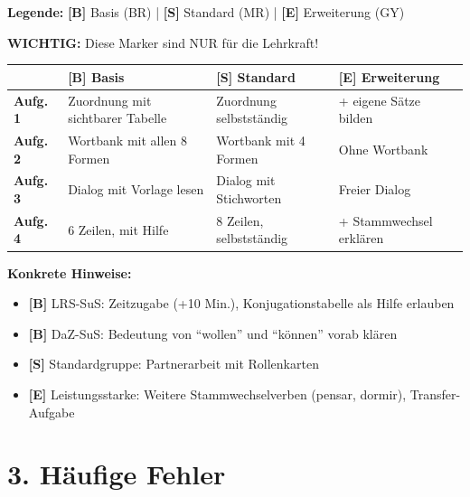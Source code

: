 \documentclass[11pt, a4paper]{article}
\newcommand{\B}{\textcolor{basis}{\textbf{[B]}}}
\newcommand{\Std}{\textcolor{standard}{\textbf{[S]}}}
\newcommand{\E}{\textcolor{erweiterung}{\textbf{[E]}}}
\begin{document}
\begin{differenzierung}
\textbf{Legende:} \B{} Basis (BR) | \Std{} Standard (MR) | \E{} Erweiterung (GY)

\vspace{0.5em}
\textbf{WICHTIG:} Diese Marker sind NUR für die Lehrkraft!
\end{differenzierung}

\vspace{1em}

\begin{tabularx}{\textwidth}{|l|X|X|X|}
\hline
& \B{} \textbf{Basis} & \Std{} \textbf{Standard} & \E{} \textbf{Erweiterung} \\
\hline
\textbf{Aufg. 1} & Zuordnung mit sichtbarer Tabelle & Zuordnung selbstständig & + eigene Sätze bilden \\
\hline
\textbf{Aufg. 2} & Wortbank mit allen 8 Formen & Wortbank mit 4 Formen & Ohne Wortbank \\
\hline
\textbf{Aufg. 3} & Dialog mit Vorlage lesen & Dialog mit Stichworten & Freier Dialog \\
\hline
\textbf{Aufg. 4} & 6 Zeilen, mit Hilfe & 8 Zeilen, selbstständig & + Stammwechsel erklären \\
\hline
\end{tabularx}

\vspace{1em}

\textbf{Konkrete Hinweise:}
\begin{itemize}
    \item \B{} LRS-SuS: Zeitzugabe (+10 Min.), Konjugationstabelle als Hilfe erlauben
    \item \B{} DaZ-SuS: Bedeutung von ``wollen'' und ``können'' vorab klären
    \item \Std{} Standardgruppe: Partnerarbeit mit Rollenkarten
    \item \E{} Leistungsstarke: Weitere Stammwechselverben (pensar, dormir), Transfer-Aufgabe
\end{itemize}


\section*{3. Häufige Fehler}
\end{document}
